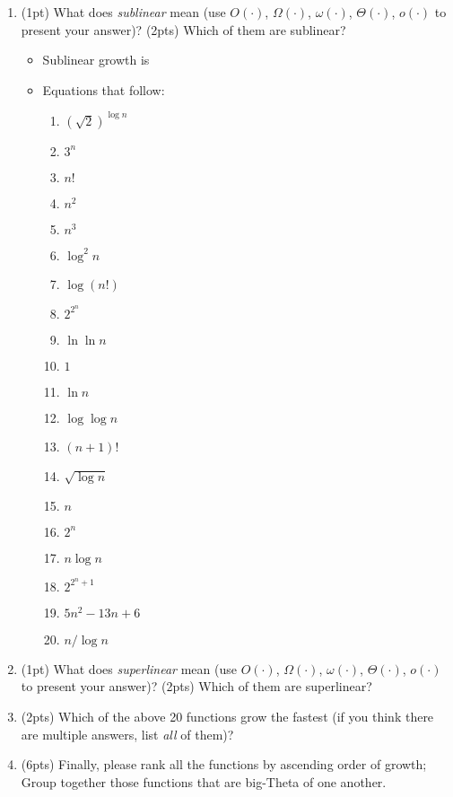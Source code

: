 \documentclass{article}[12pt]
\newcommand\encircle[1]{\raisebox{.5pt}{\textcircled{\raisebox{-.9pt} {\footnotesize #1}}} }
\begin{document}
\begin{enumerate}[label=(\arabic*)]
\begin{itemize}
    \end{itemize}

  \item (1pt) What does \emph{sublinear} mean (use $O(\cdot)$, $\Omega(\cdot)$, $\omega(\cdot)$, $\Theta(\cdot)$, $o(\cdot)$ to present your answer)? (2pts) Which of them are sublinear?
    \begin{itemize}
      \item Sublinear growth is
      \item Equations that follow:
\begin{center}
\begin{multicols}{4}
\begin{enumerate}[label=\encircle{\arabic*}]
  \item $(\sqrt{2})^{\log n}$
  \item $3^n$
  \item $n!$
  \item $n^2$
  \item $n^3$
  \item $\log^2n$
  \item $\log(n!)$
  \item $2^{2^n}$
  \item $\ln\ln n$
  \item $1$
  \item $\ln n$
  \item $\log \log n$
  \item $(n+1)!$
  \item $\sqrt{\log n}$
  \item $n$
  \item $2^n$
  \item $n\log n$
  \item $2^{2^n+1}$
  \item $5n^2-13n+6$
  \item $n/\log n$
\end{enumerate}
\end{multicols}
\end{center}

    \end{itemize}

  \item (1pt) What does \emph{superlinear} mean (use $O(\cdot)$, $\Omega(\cdot)$, $\omega(\cdot)$, $\Theta(\cdot)$, $o(\cdot)$ to present your answer)? (2pts) Which of them are superlinear?

  \item (2pts) Which of the above 20 functions grow the fastest (if you think there are multiple answers, list \emph{all} of them)?

  \item (6pts) Finally, please rank all the functions by ascending order of growth; Group together those functions that are big-Theta of one another.

\end{enumerate}
\end{document}
